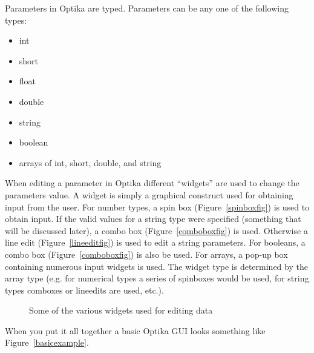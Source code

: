 Parameters in Optika are typed. Parameters can be any one of the following types:
  \begin{multicols}{2}
		\begin{itemize}
			\item int
			\item short
			\item float
			\item double
			\item string
			\item boolean
			\item arrays of int, short, double, and string
		\end{itemize}
	\end{multicols}
When editing a parameter in Optika different ``widgets'' are used to change the parameters value. A widget is simply
a graphical construct used for obtaining input from the user. For number types, a spin box (Figure~\ref{spinboxfig}) is used to obtain input. 
If the valid values for a string type were specified (something that will be discussed later), a combo box (Figure~\ref{comboboxfig}) is used.
Otherwise a line edit (Figure~\ref{lineeditfig}) is used to edit a string parameters. For booleans, a combo box (Figure~\ref{comboboxfig}) 
is also be used. For arrays, a pop-up box containing numerous input widgets is used. The widget type is determined by the
array type (e.g. for numerical types a series of spinboxes would be used, for string types comboxes or lineedits are used, etc.). 
	\begin{figure}
		\centering
		\caption{Some of the various widgets used for editing data~\cite{QtGallery}}
		\label{editingWidgets}
	\end{figure}
When you put it all together a basic Optika GUI looks something like Figure~\ref{basicexample}.
